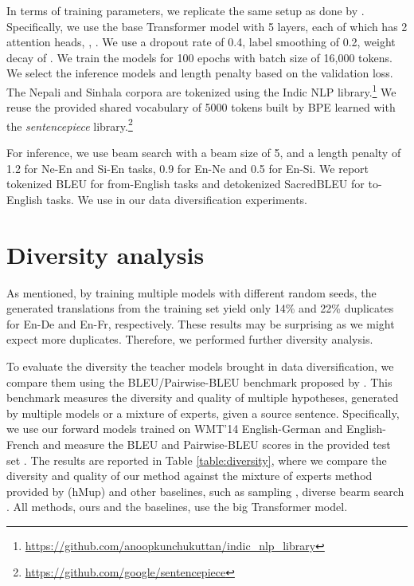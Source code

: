 \documentclass{article}
\begin{document}
In terms of training parameters, we replicate the same setup as done by \citet{flores}. Specifically, we use the base Transformer model with 5 layers, each of which has 2 attention heads, , . We use a dropout rate of 0.4, label smoothing of 0.2, weight decay of . We train the models for 100 epochs with batch size of 16,000 tokens. We select the inference models and length penalty based on the validation loss. The Nepali and Sinhala corpora are tokenized using the Indic NLP library.\footnote{\href{https://github.com/anoopkunchukuttan/indic\_nlp\_library}{https://github.com/anoopkunchukuttan/indic\_nlp\_library}} We reuse the provided shared vocabulary of 5000 tokens built by BPE learned with the \textit{sentencepiece} library.\footnote{\href{https://github.com/google/sentencepiece}{https://github.com/google/sentencepiece}} 

For inference, we use beam search with a beam size of 5, and a length penalty of 1.2 for Ne-En and  Si-En tasks, 0.9 for En-Ne and 0.5 for En-Si. We report tokenized BLEU for from-English tasks and detokenized SacredBLEU \citep{sacredbleu_post-2018-call} for to-English tasks. 
We use  in our data diversification experiments. 



\section{Diversity analysis}\label{app:diversity}


As mentioned, by training multiple models with different random seeds, the generated translations from the training set yield only 14\% and 22\% duplicates for En-De and En-Fr, respectively. These results may be surprising as we might expect more duplicates. Therefore, we performed further diversity analysis. 

{To evaluate the diversity the teacher models brought in data diversification, we compare them using the BLEU/Pairwise-BLEU benchmark proposed by \citet{mixture_model_nmt_shen2019}. This benchmark measures the diversity and quality of multiple hypotheses, generated by multiple models or a mixture of experts, given a source sentence. Specifically, we use our forward models trained on WMT'14 English-German and English-French and measure the BLEU and Pairwise-BLEU scores in the provided test set \citep{mixture_model_nmt_shen2019}. The results are reported in Table \ref{table:diversity}, where we compare the diversity and quality of our method against the mixture of experts method provided by \citet{mixture_model_nmt_shen2019} (hMup) and other baselines, such as sampling \citep{biased_sampling_graves2013generating}, diverse bearm search \citep{diverse_beamli2016simple}.} All methods, ours and the baselines, use the big Transformer model.
\end{document}
